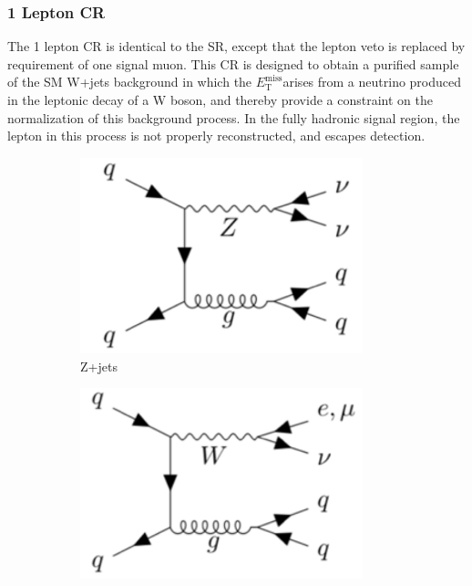 \documentclass[12pt]{article}
\newcommand*{\met}{\ensuremath{E_\text{T}^\text{miss}}}
\begin{document}
\subsubsection{1 Lepton CR}

The 1 lepton CR is identical to the SR, except that the lepton veto is replaced by requirement of one signal muon. This CR is designed to obtain a purified sample of the SM W+jets background in which the \met arises from a neutrino produced in the leptonic decay of a W boson, and thereby provide a constraint on the normalization of this background process. In the fully hadronic signal region, the lepton in this process is not properly reconstructed, and escapes detection. 

\begin{figure}[H]
     \centering
     \begin{subfigure}[b]{0.4\textwidth}
         \centering
         \includegraphics[width=0.9\textwidth]{figures/Zjet_feynman.png}
         \caption[]{Z+jets}
         \label{fig:zjets}
     \end{subfigure}
     \hfill
     \begin{subfigure}[b]{0.4\textwidth}
         \centering
         \includegraphics[width=0.9\textwidth]{figures/Wjet_feynman.png}

\end{subfigure}
\end{figure}
\end{document}
